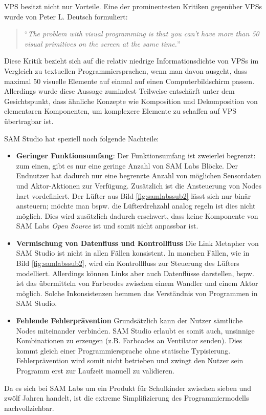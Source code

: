 \ac{VPS} besitzt nicht nur Vorteile. Eine der prominentesten Kritiken gegenüber \acp{VPS} wurde von Peter L. Deutsch \cite{MASON201368} formuliert:

\begin{quote}
    "`\textit{The problem with visual programming is that you can’t have more than 50 visual primitives on the screen at the same time.}"'
\end{quote}


Diese Kritik bezieht sich auf die relativ niedrige Informationsdichte von \acp{VPS} im Vergleich zu textuellen Programmiersprachen, wenn man davon ausgeht, dass maximal 50 visuelle Elemente auf einmal auf einen Computerbildschirm passen. Allerdings wurde diese Aussage zumindest Teilweise entschärft unter dem Gesichtspunkt, dass ähnliche Konzepte wie Komposition und Dekomposition von elementaren Komponenten, um komplexere Elemente zu schaffen auf \ac{VPS} übertragbar ist.

SAM Studio hat speziell noch folgende Nachteile:
\begin{itemize}
    \item \textbf{Geringer Funktionsumfang}: Der Funktionsumfang ist zweierlei begrenzt: zum einen, gibt es nur eine geringe Anzahl von SAM Labs Blöcke. Der Endnutzer hat dadurch nur eine begrenzte Anzahl von möglichen Sensordaten und Aktor-Aktionen zur Verfügung. Zusätzlich ist die Ansteuerung von Nodes hart vordefiniert. Der Lüfter aus Bild \ref{fig:samlabssub2} lässt sich nur binär ansteuern; möchte man bspw. die Lüfterdrehzahl analog regeln ist dies nicht möglich. Dies wird zusätzlich dadurch erschwert, dass keine Komponente von SAM Labs \textit{Open Source} ist und somit nicht anpassbar ist.
    \item \textbf{Vermischung von Datenfluss und Kontrollfluss} Die Link Metapher von SAM Studio ist nicht in allen Fällen konsistent. In manchen Fällen, wie in Bild \ref{fig:samlabssub2}, wird ein Kontrollfluss zur Steuerung des Lüfters modelliert. Allerdings können Links aber auch Datenflüsse darstellen, bspw. ist das übermitteln von Farbcodes zwischen einem Wandler und einem Aktor möglich. Solche Inkonsistenzen hemmen das Verständnis von Programmen in SAM Studio.
    \item \textbf{Fehlende Fehlerprävention} Grundsätzlich kann der Nutzer sämtliche Nodes miteinander verbinden. SAM Studio erlaubt es somit auch, unsinnige Kombinationen zu erzeugen (z.B. Farbcodes an Ventilator senden). Dies kommt gleich einer Programmiersprache ohne statische Typisierung. Fehlerprävention wird somit nicht betrieben und zwingt den Nutzer sein Programm erst zur Laufzeit manuell zu validieren.
\end{itemize}
Da es sich bei SAM Labs um ein Produkt für Schulkinder zwischen sieben und zwölf Jahren handelt, ist die extreme Simplifizierung des Programmiermodells nachvollziehbar. 

